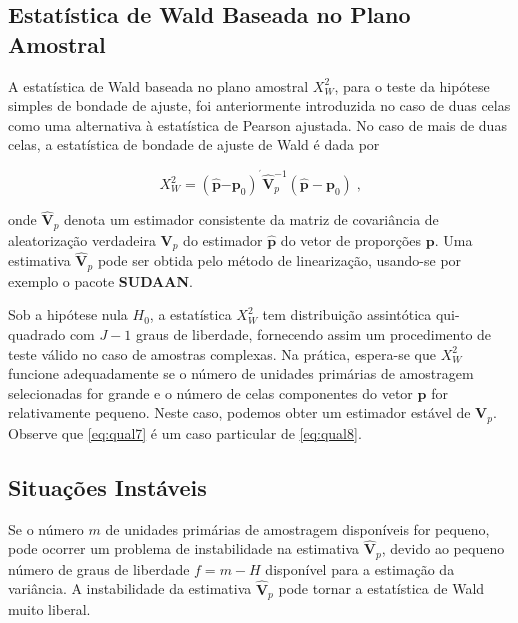 \documentclass[]{book}
\numberwithin{example}{chapter}
\numberwithin{remark}{chapter}
\numberwithin{definition}{chapter}
\begin{document}
\subsection{Estatística de Wald Baseada no Plano
Amostral}\label{estatistica-de-wald-baseada-no-plano-amostral}

A estatística de Wald baseada no plano amostral \(X_{W}^{2}\), para o
teste da hipótese simples de bondade de ajuste, foi anteriormente
introduzida no caso de duas celas como uma alternativa à estatística de
Pearson ajustada. No caso de mais de duas celas, a estatística de
bondade de ajuste de Wald é dada por

\begin{equation}
X_{W}^{2}=\left( \widehat{\mathbf{p}}\mathbf{-p}_{0}\right) ^{^{\prime }}
\widehat{\mathbf{V}}_{p}^{-1}\left( \widehat{\mathbf{p}}-\mathbf{p}_{0}\right) \;\mbox{,} 
\label{eq:qual8}
\end{equation}

onde \(\widehat{\mathbf{V}}_{p}\) denota um estimador consistente da
matriz de covariância de aleatorização verdadeira \(\mathbf{V}_{p}\) do
estimador \(\widehat{\mathbf{p}}\) do vetor de proporções
\(\mathbf{p}\). Uma estimativa \(\widehat{\mathbf{V}}_{p}\) pode ser
obtida pelo método de linearização, usando-se por exemplo o pacote
\textbf{SUDAAN}.

Sob a hipótese nula \(H_{0}\), a estatística \(X_{W}^{2}\) tem
distribuição assintótica qui-quadrado com \(J-1\) graus de liberdade,
fornecendo assim um procedimento de teste válido no caso de amostras
complexas. Na prática, espera-se que \(X_{W}^{2}\) funcione
adequadamente se o número de unidades primárias de amostragem
selecionadas for grande e o número de celas componentes do vetor
\(\mathbf{p}\) for relativamente pequeno. Neste caso, podemos obter um
estimador estável de \(\mathbf{V}_{p}\). Observe que \eqref{eq:qual7} é um
caso particular de \eqref{eq:qual8}.

\subsection{Situações Instáveis}\label{situacoes-instaveis}

Se o número \(m\) de unidades primárias de amostragem disponíveis for
pequeno, pode ocorrer um problema de instabilidade na estimativa
\(\widehat{\mathbf{V}}_{p}\), devido ao pequeno número de graus de
liberdade \(f=m-H\) disponível para a estimação da variância. A
instabilidade da estimativa \(\widehat{\mathbf{V}}_{p}\) pode tornar a
estatística de Wald muito liberal.
\end{document}

